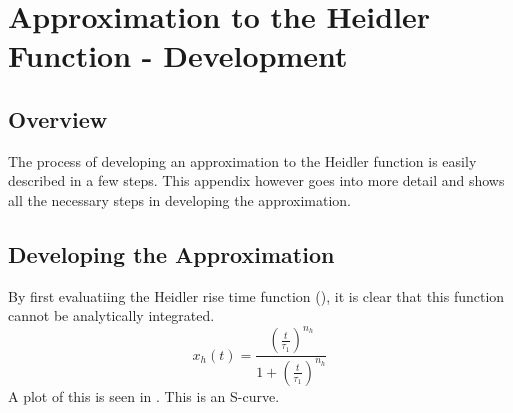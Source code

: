 
\chapter{Approximation to the Heidler Function - Development} %

\label{AppendixDev} %



\section{Overview}
\label{sec:app_dev_overview}
The process of developing an approximation to the Heidler function is easily described in a few steps. This appendix however goes into more detail and shows all the necessary steps in developing the approximation.


\section{Developing the Approximation}
\label{sec:app_dev_developing_the_approximation}
By first evaluatiing the Heidler rise time function (), it is clear that this function cannot be analytically integrated.
\begin{equation}
    x_h \left( t \right) = \frac{{\left (\frac{t}{\tau_1} \right )}^{n_h}}{1 + {\left (\frac{t}{\tau_1} \right )}^{n_h}}
    \label{eqn:app_HFrise}
\end{equation}
A plot of this is seen in . This is an S-curve.

